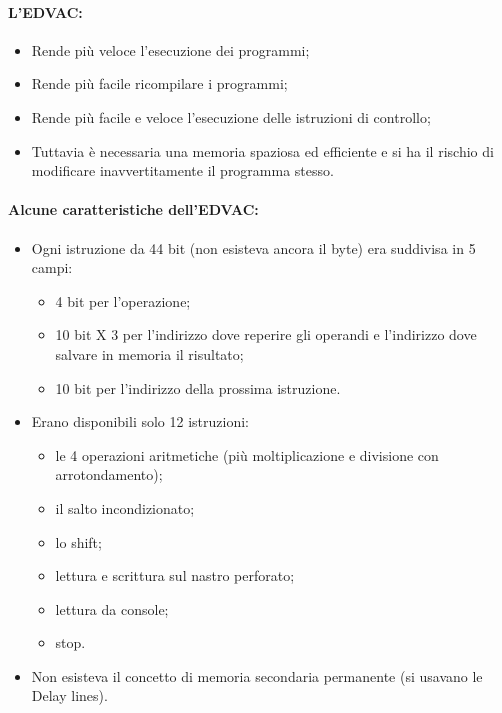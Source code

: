 \paragraph{L'EDVAC:}

\begin{itemize}
    \item Rende più veloce l'esecuzione dei programmi;
    \item Rende più facile ricompilare i programmi;
    \item Rende più facile e veloce l'esecuzione delle istruzioni di controllo;
    \item Tuttavia è necessaria una memoria spaziosa ed efficiente e si ha il rischio di 
    modificare inavvertitamente il programma stesso.
\end{itemize}

\paragraph{Alcune caratteristiche dell'EDVAC:}

\begin{itemize}
    \item Ogni istruzione da 44 bit (non esisteva ancora il byte) era suddivisa in 5 campi:
    \begin{itemize}
        \item 4 bit per l'operazione;
        \item 10 bit X 3 per l'indirizzo dove reperire gli operandi e l'indirizzo dove salvare in memoria il risultato;
        \item 10 bit per l'indirizzo della prossima istruzione.
    \end{itemize}
    \item Erano disponibili solo 12 istruzioni:
    \begin{itemize}
        \item le 4 operazioni aritmetiche (più moltiplicazione e divisione con arrotondamento); 
        \item il salto incondizionato;
        \item lo shift;
        \item lettura e scrittura sul nastro perforato;
        \item lettura da console;
        \item stop.
    \end{itemize}
    \item Non esisteva il concetto di memoria secondaria permanente (si usavano le Delay lines).
\end{itemize}

